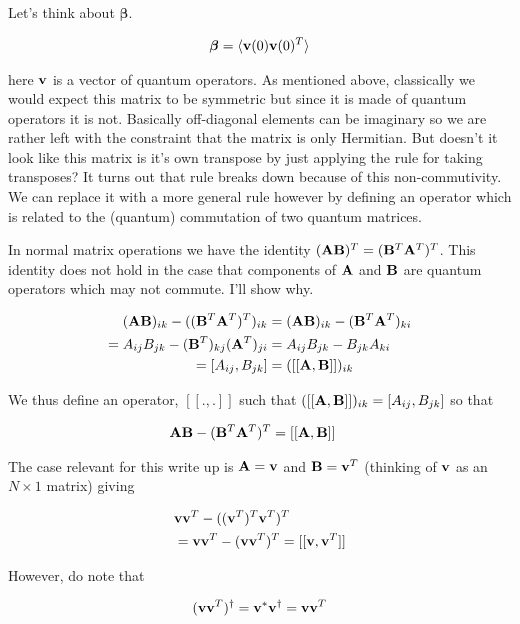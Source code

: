 \documentclass[12pt]{article}
\newcommand{\bv}[1]{\bold{#1}}
\newcommand{\bvs}[1]{\boldsymbol{#1}}
\begin{document}
Let's think about $\bvs{\beta}$.

\begin{align}
\bvs{\beta} = \braket{\bv{v}(0)\bv{v}(0)^T}
\end{align}

here $\bv{v}$ is a vector of quantum operators. As mentioned above, classically we would expect this matrix to be symmetric but since it is made of quantum operators it is not. Basically off-diagonal elements can be imaginary so we are rather left with the constraint that the matrix is only Hermitian. But doesn't it look like this matrix is it's own transpose by just applying the rule for taking transposes? It turns out that rule breaks down because of this non-commutivity. We can replace it with a more general rule however by defining an operator which is related to the (quantum) commutation of two quantum matrices.  

In normal matrix operations we have the identity $(\bv{A}\bv{B})^T = (\bv{B}^T\bv{A}^T)^T$. This identity does not hold in the case that components of $\bv{A}$ and $\bv{B}$ are quantum operators which may not commute. I'll show why.

\begin{align}
(\bv{A}\bv{B})_{ik} - ((\bv{B}^T\bv{A}^T)^T)_{ik} &= (\bv{A}\bv{B})_{ik} - (\bv{B}^T\bv{A}^T)_{ki}\\
= A_{ij} B_{jk} - (\bv{B}^T)_{kj}(\bv{A}^T)_{ji} &= A_{ij}B_{jk} - B_{jk} A_{ki}\\
= [A_{ij},B_{jk}] &= ([[\bv{A},\bv{B}]])_{ik} 
\end{align}

We thus define an operator, $[[.,.]]$ such that $([[\bv{A},\bv{B}]])_{ik} = [A_{ij},B_{jk}]$ so that

\begin{align}
&\bv{A}\bv{B} - (\bv{B}^T\bv{A}^T)^T = [[\bv{A},\bv{B}]]
\end{align}

The case relevant for this write up is $\bv{A} = \bv{v}$ and $\bv{B} = \bv{v}^T$ (thinking of $\bv{v}$ as an $N\times1$ matrix) giving

\begin{align}
&\bv{v}\bv{v}^T - ((\bv{v}^T)^T\bv{v}^T)^T\\
&= \bv{v}\bv{v}^T - (\bv{v}\bv{v}^T)^T = [[\bv{v},\bv{v}^T]]
\end{align}

However, do note that

\begin{align}
(\bv{v}\bv{v}^T)^{\dag} = \bv{v}^* \bv{v}^{\dag} = \bv{v}\bv{v}^T
\end{align}
\end{document}
